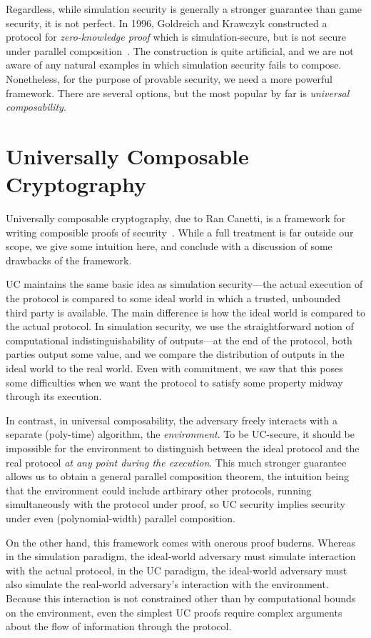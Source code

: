 Regardless, while simulation security is generally a stronger guarantee than
game security, it is not perfect. In 1996, Goldreich and Krawczyk constructed a
protocol for \emph{zero-knowledge proof} which is simulation-secure, but is not
secure under parallel composition~\cite{goldreich-krawczyk-1996}. The
construction is quite artificial, and we are not aware of any natural examples
in which simulation security fails to compose. Nonetheless, for the purpose of
provable security, we need a more powerful framework. There are several options,
but the most popular by far is \emph{universal composability}.

\section{Universally Composable Cryptography}

Universally composable cryptography, due to Ran Canetti, is a framework for
writing composible proofs of security~\cite{canetti-2000}. While a full
treatment is far outside our scope, we give some intuition here, and conclude
with a discussion of some drawbacks of the framework.

UC maintains the same basic idea as simulation security---the actual execution
of the protocol is compared to some ideal world in which a trusted, unbounded
third party is available. The main difference is how the ideal world is compared
to the actual protocol. In simulation security, we use the straightforward
notion of computational indistinguishability of outputs---at the end of the
protocol, both parties output some value, and we compare the distribution of
outputs in the ideal world to the real world. Even with commitment, we saw that
this poses some difficulties when we want the protocol to satisfy some property
midway through its execution.

In contrast, in universal composability, the adversary freely interacts with a
separate (poly-time) algorithm, the \emph{environment}. To be UC-secure, it
should be impossible for the environment to distinguish between the ideal
protocol and the real protocol \emph{at any point during the execution}. This
much stronger guarantee allows us to obtain a general parallel composition
theorem, the intuition being that the environment could include artbirary other
protocols, running simultaneously with the protocol under proof, so UC security
implies security under even (polynomial-width) parallel composition.

On the other hand, this framework comes with onerous proof buderns. Whereas in
the simulation paradigm, the ideal-world adversary must simulate interaction with
the actual protocol, in the UC paradigm, the ideal-world adversary must also
simulate the real-world adversary's interaction with the environment. Because
this interaction is not constrained other than by computational bounds on the
environment, even the simplest UC proofs require complex arguments about the
flow of information through the protocol.

